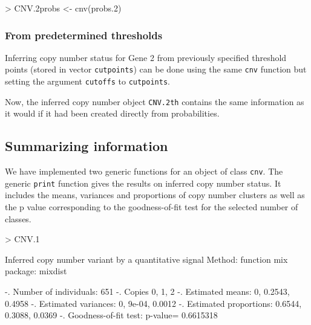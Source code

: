 \documentclass[11pt]{article}
\begin{document}
\begin{Schunk}
\begin{Sinput}
> CNV.2probs <- cnv(probs.2)
\end{Sinput}
\end{Schunk}


%
\subsubsection{From predetermined thresholds}

Inferring copy number status for Gene 2 from previously specified threshold points (stored in vector \texttt{cutpoints}) can be done using
the same \texttt{cnv} function but setting the argument \texttt{cutoffs} to \texttt{cutpoints}.

\begin{Schunk}
\end{Schunk}

Now, the inferred copy number object \texttt{CNV.2th} contains the same information as it would if it had been created directly from probabilities. 


\subsection{Summarizing information} \label{subsection - Summarizing information}

We have implemented two generic functions for an object of class {\tt cnv}. The generic {\tt print} function gives the results on 
inferred copy number status. It includes the means, variances and proportions of copy number clusters as well as the p value corresponding 
to the goodness-of-fit test for the selected number of classes.

\begin{Schunk}
\begin{Sinput}
> CNV.1
\end{Sinput}
\begin{Soutput}
Inferred copy number variant by a quantitative signal
   Method: function mix {package: mixdist}  

-. Number of individuals: 651 
-. Copies 0, 1, 2 
-. Estimated means: 0, 0.2543, 0.4958 
-. Estimated variances: 0, 9e-04, 0.0012 
-. Estimated proportions: 0.6544, 0.3088, 0.0369 
-. Goodness-of-fit test: p-value= 0.6615318 
\end{Soutput}
\end{Schunk}
\end{document}
